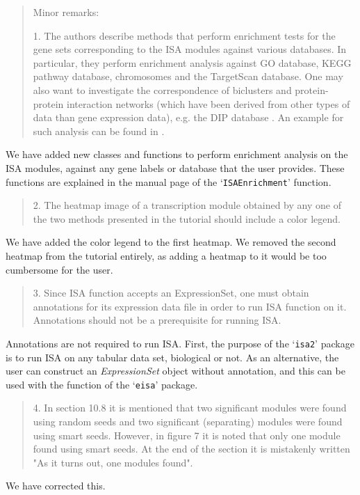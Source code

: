 \documentclass[a4paper]{article}
\newcommand{\Rpackage}[1]{`\texttt{#1}'}
\newcommand{\Rfunction}[1]{`\texttt{#1}'}
\newcommand{\Rclass}[1]{\textsl{#1}}
\newenvironment{myquote}{\begin{quote}\color{blue}}{\end{quote}}
\begin{document}
\begin{myquote}
Minor remarks:

1.      The authors describe methods that perform enrichment tests for
the gene sets corresponding to the ISA modules against various
databases. In particular, they perform enrichment analysis against GO
database, KEGG pathway database, chromosomes and the TargetScan \citep{targetscan}
database. One may also want to investigate the correspondence of
biclusters and protein-protein interaction networks (which have been
derived from other types of data than gene expression data), e.g. the
DIP database \citep{salwinski04}. An example for such analysis can be
found in \citet{prelic06}.
\end{myquote}

We have added new classes and functions to perform enrichment analysis
on the ISA modules, against any gene labels or database that the user
provides. These functions are explained in the manual page of the
\Rfunction{ISAEnrichment} function.

\begin{myquote}
2.      The heatmap image of a transcription module obtained by any
one of the two methods presented in the tutorial should include a
color legend. 
\end{myquote}

We have added the color legend to the first heatmap. We removed the 
second heatmap from the tutorial entirely, as adding a heatmap to 
it would be too cumbersome for the user.

\begin{myquote}
3.      Since ISA function accepts an ExpressionSet, one must obtain
annotations for its expression data file in order to run ISA function
on it. Annotations should not be a prerequisite for running ISA. 
\end{myquote}

Annotations are not required to run ISA. First, the purpose of the
\Rpackage{isa2} package is to run ISA on any tabular data set,
biological or not. As an alternative, the user can construct an
\Rclass{ExpressionSet} object without annotation, and this can be used
with the function of the \Rpackage{eisa} package.

\begin{myquote}
4.      In section 10.8 it is mentioned that two significant modules
were found using random seeds and two significant (separating) modules
were found using smart seeds. However, in figure 7 it is noted that
only one module found using smart seeds. At the end of the section it
is mistakenly written "As it turns out, one modules found". 
\end{myquote}

We have corrected this.



\end{document}
